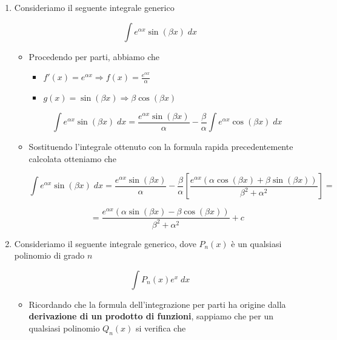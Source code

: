 \documentclass[a4paper, 12pt]{report}
\begin{document}
\begin{enumerate}
        
        \quad
        
        \quad
        
        \item Consideriamo il seguente integrale generico 
        
        \[ \int e^{\alpha x} \sin(\beta x) \; dx\]
        
        \begin{itemize}
            \item Procedendo per parti, abbiamo che
            
            \begin{itemize}
                \item $f'(x) = e^{\alpha x} \Longrightarrow f(x) = \frac{e^{\alpha x}}{\alpha}$
                \item $g(x) = \sin(\beta x) \Longrightarrow \beta \cos(\beta x)$
            \end{itemize}
            
            \[ \int e^{\alpha x} \sin(\beta x) \; dx = \frac{e^{\alpha x}\sin(\beta x)}{\alpha}-\frac{\beta}{\alpha} \int e^{\alpha x}\cos(\beta x) \; dx\]
            
            \item Sostituendo l'integrale ottenuto con la formula rapida precedentemente calcolata otteniamo che
            
            \[ \int e^{\alpha x} \sin(\beta x) \; dx = \frac{e^{\alpha x}\sin(\beta x)}{\alpha}-\frac{\beta}{\alpha} \left [ \frac{e^{\alpha x} (\alpha \cos(\beta x) + \beta \sin(\beta x))}{\beta^2 + \alpha^2} \right ] =\]
            
            \[ = \frac{e^{\alpha x} (\alpha \sin(\beta x) - \beta \cos(\beta x))}{\beta^2 + \alpha^2}+c\]
            
        \end{itemize}
        
        \item Consideriamo il seguente integrale generico, dove $P_n(x)$ è un qualsiasi polinomio di grado $n$
        
        \[ \int P_n(x) e^x\; dx\]
        
        \begin{itemize}
            \item Ricordando che la formula dell'integrazione per parti ha origine dalla \textbf{derivazione di un prodotto di funzioni}, sappiamo che per un qualsiasi polinomio $Q_n(x)$ si verifica che
            

\end{itemize}
\end{enumerate}
\end{document}

